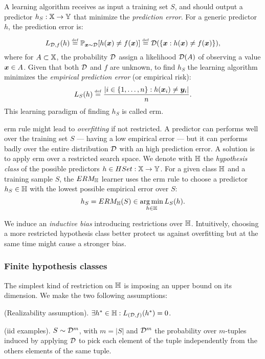 A learning algorithm receives as input a training set $S$, and should
output a predictor $h_S:\mathbb{X}\rightarrow\mathbb{Y}$ that minimize the
\emph{prediction error}. For a generic predictor $h$, the prediction
error is:
\begin{equation}\label{predictionError}
  L_{\mathcal{D},f}(h)\overset{\underset{\mathrm{def}}{}}{=}\mathbb{P}_{\bm{x}\sim\mathcal{D}}[h(\bm{x})\neq
  f(\bm{x})]\overset{\underset{\mathrm{def}}{}}{=}\mathcal{D}(\{\bm{x}:h(\bm{x})\neq
  f(\bm{x})\}),
\end{equation}
where for $A\subset\mathbb{X}$, the probability $\mathcal{D}$ assign a
likelihood $\mathcal{D}(A)$ of observing a value $\bm{x}\in A$. Given
that both $\mathcal{D}$ and $f$ are unknown, to find $h_S$ the learning
algorithm minimizes the \emph{empirical prediction error} (or
empirical risk):
\begin{equation}\label{empiricalError}
  L_S(h)\overset{\underset{\mathrm{def}}{}}{=}\frac{|i\in\{1,\dots,n\}:h(\bm{x}_i)\neq\bm{y}_i|}{n}.
\end{equation}
This learning paradigm of finding $h_S$ is called \ac{erm}.

\ac{erm} rule might lead to \emph{overfitting} if not restricted. A predictor
can performs well over the training set $S$ --- having a low empirical
error --- but it can performs badly over the entire distribution
$\mathcal{D}$ with an high prediction error. A solution is to apply
\ac{erm} over a restricted search space. We denote with $\mathbb{H}$ the
\emph{hypothesis class} of the possible predictors
$h\in{HSet}:\mathbb{X}\rightarrow\mathbb{Y}$. For a given class $\mathbb{H}$ and a
training sample $S$, the $ERM_{\mathbb{H}}$ learner uses the \ac{erm} rule to
choose a predictor $h_S\in\mathbb{H}$ with the lowest possible empirical
error over $S$:
\begin{equation*}
  h_S=ERM_{\mathbb{H}}(S)\in \operatorname*{arg\,min}_{h\in\mathbb{H}} L_S(h).
\end{equation*}

We induce an \emph{inductive bias} introducing restrictions over
$\mathbb{H}$. Intuitively, choosing a more restricted hypothesis class
better protect us against overfitting but at the same time might cause
a stronger bias.

\subsubsection{Finite hypothesis classes}
The simplest kind of restriction on $\mathbb{H}$ is
imposing an upper bound on its dimension. We make the two following
assumptions: 
\begin{definition}\label{realizability}
  (Realizability assumption). $\exists h^*\in\mathbb{H} : L_{(\mathcal{D},f)}(h^*)=0$.
\end{definition}
\begin{definition}
  (\ac{iid} examples). $S\sim\mathcal{D}^m$, with $m=|S|$ and $\mathcal{D}^m$ the
  probability over $m$-tuples induced by applying $\mathcal{D}$ to pick
  each element of the tuple independently from the others elements of
  the same tuple.
\end{definition}

